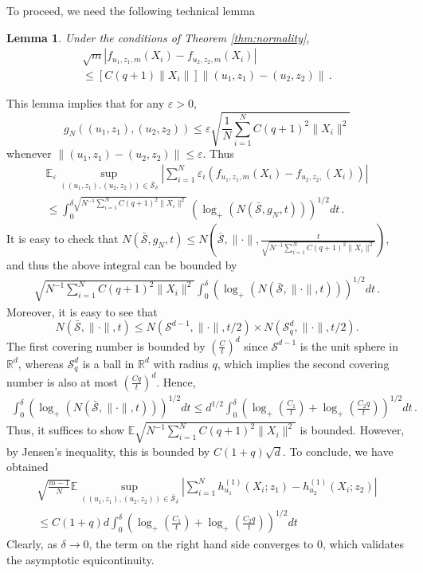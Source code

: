 \documentclass[12pt]{article}
\def\l{\left}
\def\r{\right}
\newcommand{\mb}{\mathbb}
\newtheorem{lemma}{Lemma}
\theoremstyle{thmstyletwo}%
\theoremstyle{thmstylethree}%
\begin{document}
To proceed, we need the following technical lemma
\begin{lemma}\label{lemma:Delta2}
    Under the conditions of Theorem \ref{thm:normality}, 
    \begin{multline}\label{eq:f-diff}
     \sqrt{m}\l\lvert f_{u_1,z_1,m}(X_i) - f_{u_2,z_2,m}(X_i) \r\rvert \\
    \leq \l[C(q+1)\|X_i\|\r] \|(u_1, z_1) - (u_2, z_2)\|\,.
\end{multline}
\end{lemma}
This lemma implies that for any $\varepsilon > 0$, 
\[
g_N \l((u_1, z_1), (u_2, z_2)\r) \leq \varepsilon\sqrt{\frac{1}{N}\sum_{i=1}^N C(q+1)^2\|X_i\|^2}
\]
whenever
\(
\|(u_1, z_1) - (u_2, z_2)\| \leq \varepsilon.
\)
Thus
\begin{multline*}
    \mb E_\varepsilon \sup_{((u_1,z_1), (u_2,z_2)) \in \bar{\mathcal{S}}_\delta} \l\lvert \sum_{i=1}^N \varepsilon_i \l(f_{u_1,z_1,m}(X_i) - f_{u_2,z_2,}(X_i)\r)\r\rvert \\ \leq \int_0^{\delta\sqrt{N^{-1}\sum_{i=1}^N C(q+1)^2\|X_i\|^2}} \l(\log_+\l(N(\bar{\mathcal{S}}, g_N, t)\r)\r)^{1/2} dt \,.
\end{multline*}
It is easy to check that $N(\bar{\mathcal{S}}, g_N, t) \leq N\l(\bar{\mathcal{S}}, \|\cdot\|, \frac{t}{\sqrt{N^{-1}\sum_{i=1}^N C(q+1)^2\|X_i\|^2}}\r)$, and thus the above integral can be bounded by
\begin{align*}
    \sqrt{N^{-1}\sum_{i=1}^N C(q+1)^2\|X_i\|^2} \int^\delta_0 \l(\log_+\l(N(\bar{\mathcal{S}}, \|\cdot\|, t)\r)\r)^{1/2} dt\,.
\end{align*}
Moreover, it is easy to see that 
\[
N(\bar{\mathcal{S}}, \|\cdot\|, t) \leq N(\mathcal{S}^{d-1}, \|\cdot\|, t/2) \times N(\mathcal{S}^{d}_q, \|\cdot\|, t/2).
\]
The first covering number is bounded by $\l(\frac{C}{t}\r)^{d}$ since $\mathcal{S}^{d-1}$ is the unit sphere in $\mb R^d$, whereas $\mathcal{S}^d_{q}$ is a ball in $\mb R^d$ with radius $q$, which implies the second covering number is also at most $\l(\frac{Cq}{t}\r)^{d}$. Hence, 
\begin{align*}
\int^\delta_0 \l(\log_+\l(N(\bar{\mathcal{S}}, \|\cdot\|, t)\r)\r)^{1/2} dt \leq d^{1/2}\int^\delta_0 \l(\log_+\l(\frac{C_1}{t} \r) + \log_+\l(\frac{C_2q}{t}\r)\r)^{1/2} dt\,. 
\end{align*}
Thus, it suffices to show $\mb E \sqrt{N^{-1}\sum_{i=1}^N C(q+1)^2\|X_i\|^2}$ is bounded. However, by Jensen's inequality, this is bounded by $C(1+q)\sqrt{d}$. To conclude, we have obtained
\begin{multline*}
    \sqrt{\frac{m-1}{N}} \mb E \sup_{((u_1,z_1), (u_2,z_2)) \in \bar{\mathcal{S}}_\delta} \l\lvert  \sum_{i=1}^N h^{(1)}_{u_1}(X_i; z_1) - h^{(1)}_{u_2}(X_i; z_2)\r\rvert \\
    \leq C(1+q)d \int^\delta_0 \l(\log_+\l(\frac{C_1}{t} \r) + \log_+\l(\frac{C_2q}{t}\r)\r)^{1/2} dt
\end{multline*}
Clearly, as $\delta \rightarrow 0$, the term on the right hand side converges to $0$, which validates the asymptotic equicontinuity.
\end{document}

